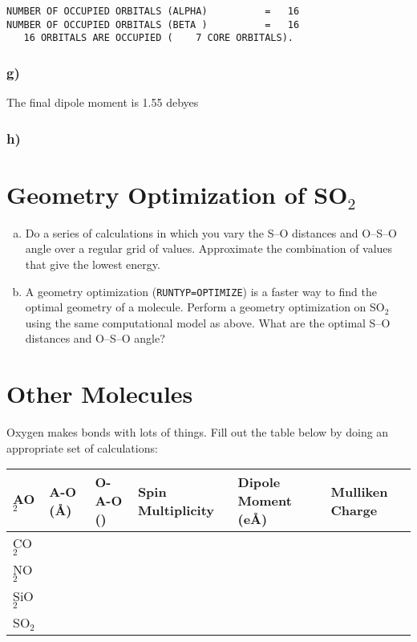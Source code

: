 \documentclass[11pt]{article}
\begin{document}
\begin{verbatim}
NUMBER OF OCCUPIED ORBITALS (ALPHA)          =   16
NUMBER OF OCCUPIED ORBITALS (BETA )          =   16
   16 ORBITALS ARE OCCUPIED (    7 CORE ORBITALS).
\end{verbatim}




\subsubsection{g)}
\label{sec-2-1-7}

The final dipole moment is 1.55 debyes

\subsubsection{h)}
\label{sec-2-1-8}

\section{Geometry Optimization of SO$_{\text{2}}$}
\label{sec-3}

\begin{enumerate}[(a)]
\item Do a series of calculations in which you vary the S–O distances and O–S–O angle over a regular grid of values. Approximate the combination of values that give the lowest energy.

\item A geometry optimization (\verb~RUNTYP=OPTIMIZE~) is a faster way to find the optimal geometry of a molecule. Perform a geometry optimization on SO$_{\text{2}}$ using the same computational model as above. What are the optimal S–O distances and O–S–O angle?
\end{enumerate}

\section{Other Molecules}
\label{sec-4}

Oxygen makes bonds with lots of things. Fill out the table below by doing an appropriate set of calculations:

\begin{center}
\begin{tabular}{llllll}
AO$_{\text{2}}$ & A-O (\AA{}) & O-A-O (\textdegree{}) & Spin Multiplicity & Dipole Moment (e\AA{}) & Mulliken Charge\\
\hline
CO$_{\text{2}}$ &  &  &  &  & \\
NO$_{\text{2}}$ &  &  &  &  & \\
SiO$_{\text{2}}$ &  &  &  &  & \\
SO$_{\text{2}}$ &  &  &  &  & \\
\end{tabular}
\end{center}
\end{document}
